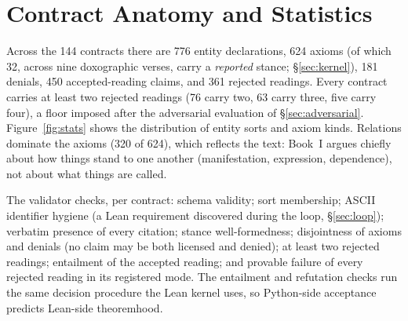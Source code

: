 \documentclass[11pt]{article}
\begin{document}
\section{Contract Anatomy and Statistics}
\label{sec:contracts}

Across the 144 contracts there are 776 entity declarations, 624 axioms (of
which 32, across nine doxographic verses, carry a \emph{reported} stance;
\S\ref{sec:kernel}), 181 denials, 450 accepted-reading claims, and 361
rejected readings. Every contract carries at least two rejected readings (76
carry two, 63 carry three, five carry four), a floor imposed after the
adversarial evaluation of \S\ref{sec:adversarial}. Figure~\ref{fig:stats}
shows the distribution of entity sorts and axiom kinds. Relations dominate
the axioms (320 of 624), which reflects the text: Book~I argues chiefly
about how things stand to one another (manifestation, expression,
dependence), not about what things are called.

The validator checks, per contract: schema validity; sort membership; ASCII
identifier hygiene (a Lean requirement discovered during the loop,
\S\ref{sec:loop}); verbatim presence of every citation; stance well-formedness;
disjointness of axioms and denials (no claim may be both licensed and denied);
at least two rejected readings; entailment of the accepted reading; and
provable failure of every rejected reading in its registered mode. The
entailment and refutation checks run the same decision procedure the Lean
kernel uses, so Python-side acceptance predicts Lean-side theoremhood.
\end{document}
